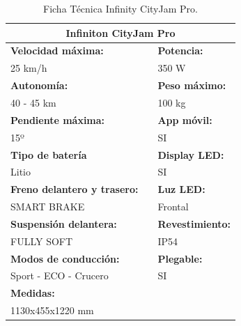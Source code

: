 \begin{table}[H]
\centering
\begin{tabular}{lll}
\multicolumn{3}{c}{\textbf{Infiniton CityJam Pro}}                        \\ \hline
\textbf{Velocidad máxima:}          &           & \textbf{Potencia:}      \\
25 km/h                             &           & 350 W                   \\
\textbf{Autonomía:}                 &           & \textbf{Peso máximo:}   \\
40 - 45 km                          &           & 100 kg                  \\
\textbf{Pendiente máxima:}          &           & \textbf{App móvil:}     \\
15º                                 & \textbf{} & SI                      \\
\textbf{Tipo de batería}            &           & \textbf{Display LED:}   \\
Litio                               &           & SI                      \\
\textbf{Freno delantero y trasero:} &           & \textbf{Luz LED:}       \\
SMART BRAKE                         &           & Frontal                 \\
\textbf{Suspensión delantera:}      &           & \textbf{Revestimiento:} \\
FULLY SOFT                          &           & IP54                    \\
\textbf{Modos de conducción:}       &           & \textbf{Plegable:}      \\
Sport - ECO - Crucero               &           & SI                      \\
\textbf{Medidas:}                   &           &                         \\
1130x455x1220 mm                    &           &                        
\end{tabular}
\caption{Ficha Técnica Infinity CityJam Pro.}
\label{tab: ficha tecnica infinity cityjam}
\end{table}
